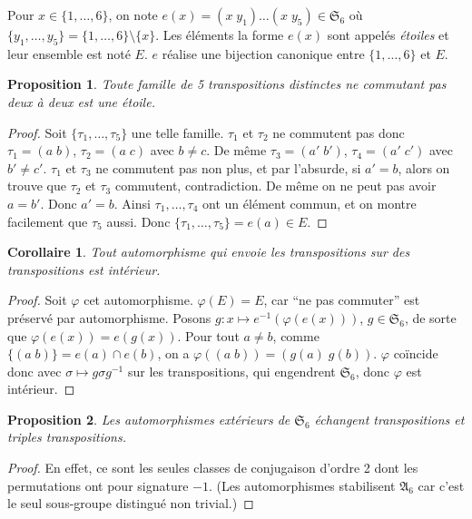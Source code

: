 \documentclass[a4paper, 11pt]{article}
\def\Sigmap{\mathfrak{S}}
\newtheorem*{proposition}{Proposition}
\newtheorem*{corollary}{Corollaire}
\begin{document}
Pour $x \in \{1, \ldots, 6\}$, on note $e(x) = (x\;y_1)\ldots(x\;y_5) \in
\Sigmap_6$ où $\{ y_1, \ldots, y_5 \} = \{1, \ldots, 6\}\setminus\{x\}$. Les
éléments la forme $e(x)$ sont appelés \emph{étoiles} et leur ensemble est noté
$E$. $e$ réalise une bijection canonique entre $\{1, \ldots, 6\}$ et $E$.

\begin{proposition}
  Toute famille de 5 transpositions distinctes ne commutant pas deux à deux est
  une étoile.
\end{proposition}
\begin{proof}
  Soit $\{\tau_1, \ldots, \tau_5\}$ une telle famille. $\tau_1$ et $\tau_2$ ne
  commutent pas donc $\tau_1 = (a\;b)$, $\tau_2 = (a\;c)$ avec $b \neq c$. De
  même $\tau_3 = (a'\;b')$, $\tau_4 = (a'\;c')$ avec $b' \neq c'$. $\tau_1$ et
  $\tau_3$ ne commutent pas non plus, et par l'absurde, si $a' = b$, alors on
  trouve que $\tau_2$ et $\tau_3$ commutent, contradiction. De même on ne peut
  pas avoir $a = b'$. Donc $a' = b$. Ainsi $\tau_1, \ldots, \tau_4$ ont un
  élément commun, et on montre facilement que $\tau_5$ aussi. Donc $\{\tau_1,
  \ldots, \tau_5\} = e(a) \in E$.
\end{proof}

\begin{corollary}
  Tout automorphisme qui envoie les transpositions sur des transpositions est
  intérieur.
\end{corollary}
\begin{proof}
  Soit $\varphi$ cet automorphisme. $\varphi(E) = E$, car \enquote{ne pas commuter}
  est préservé par automorphisme. Posons $g : x \mapsto e^{-1}(\varphi(e(x)))$, $g
  \in \Sigmap_6$, de sorte que $\varphi(e(x)) = e(g(x))$. Pour tout $a \neq b$,
  comme $\{(a\;b)\} = e(a) \cap e(b)$, on a $\varphi((a\;b)) = (g(a)\;g(b))$.
  $\varphi$ coïncide donc avec $\sigma \mapsto g\sigma g^{-1}$ sur les
  transpositions, qui engendrent $\Sigmap_6$, donc $\varphi$ est intérieur.
\end{proof}

\begin{proposition}
  Les automorphismes extérieurs de $\Sigmap_6$ échangent transpositions et
  triples transpositions.
\end{proposition}
\begin{proof}
  En effet, ce sont les seules classes de conjugaison d'ordre 2 dont les
  permutations ont pour signature $-1$. (Les automorphismes stabilisent
  $\mathfrak{A}_6$ car c'est le seul sous-groupe distingué non trivial.)
\end{proof}
\end{document}

